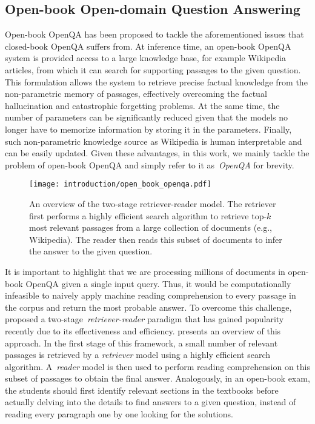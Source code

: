 \subsection{Open-book Open-domain Question Answering}
\label{sec:open_book}
%
Open-book OpenQA has been proposed to tackle the aforementioned issues that closed-book OpenQA suffers from. 
%
At inference time, an open-book OpenQA system is provided access to a large knowledge base, for example Wikipedia articles, from which it can search for supporting passages to the given question.
%
This formulation allows the system to retrieve precise factual knowledge from the non-parametric memory of passages, effectively overcoming the factual hallucination and catastrophic forgetting problems.
%
At the same time, the number of parameters can be significantly reduced given that the models no longer have to memorize information by storing it in the parameters.
%
Finally, such non-parametric knowledge source as Wikipedia is human interpretable and can be easily updated.
%
Given these advantages, in this work, we mainly tackle the problem of open-book OpenQA and simply refer to it as~\emph{OpenQA}  for brevity.


\begin{figure}[!htbp]
	\centering
	\texttt{[image: introduction/open\_book\_openqa.pdf]}
	\caption[An overview of the two-stage retriever-reader model.]{
		An overview of the two-stage retriever-reader model.
		The retriever first performs a highly efficient search algorithm to retrieve top-$k$ most relevant passages from a large collection of documents (e.g., Wikipedia).
		The reader then reads this subset of documents to infer the answer to the given question.
	}
	\label{fig:open_book_openqa}
\end{figure}


%
It is important to highlight that we are processing millions of documents in open-book OpenQA given a single input query.
%
Thus, it would be computationally infeasible to naively apply machine reading comprehension to every passage in the corpus and return the most probable answer.
%
To overcome this challenge,~\citet{chen2017reading} proposed a two-stage~\emph{retriever-reader} paradigm that has gained popularity recently due to its effectiveness and efficiency.
%
 presents an overview of this approach.
%
In the first stage of this framework, a small number of relevant passages is retrieved by a \emph{retriever} model using a highly efficient search algorithm.
%
A~\emph{reader} model is then used to perform reading comprehension on this subset of passages to obtain the final answer.
%
Analogously, in an open-book exam, the students should first identify relevant sections in the
textbooks before actually delving into the details to find answers to a given question, instead
of reading every paragraph one by one looking for the solutions.

